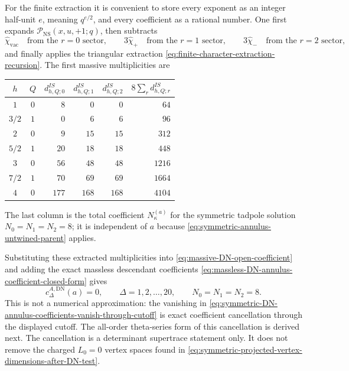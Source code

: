 \documentclass[11pt]{article}
\newcommand{\vac}{\mathrm{vac}}
\newcommand{\NS}{\mathrm{NS}}
\newcommand{\DN}{\mathrm{DN}}
\begin{document}
For the finite extraction it is convenient to store every exponent as an integer half-unit
\(e\), meaning \(q^{e/2}\), and every coefficient as a rational number. One first expands
\(\mathcal P_{\NS}(x,u,+1;q)\), then subtracts
\[
  \widehat\chi_{\vac}\quad\text{from the }r=0\text{ sector},\qquad
  3\widehat\chi_{+}\quad\text{from the }r=1\text{ sector},\qquad
  3\widehat\chi_{-}\quad\text{from the }r=2\text{ sector},
\]
and finally applies the triangular extraction
\eqref{eq:finite-character-extraction-recursion}. The first massive multiplicities are
\begin{center}
\begin{tabular}{@{}ccrrrr@{}}
\toprule
\(h\) & \(Q\) & \(d_{h,Q;0}^{IS}\) & \(d_{h,Q;1}^{IS}\) & \(d_{h,Q;2}^{IS}\)
& \(8\sum_r d_{h,Q;r}^{IS}\) \\
\midrule
\(1\) & \(0\) & \(8\) & \(0\) & \(0\) & \(64\) \\
\(3/2\) & \(1\) & \(0\) & \(6\) & \(6\) & \(96\) \\
\(2\) & \(0\) & \(9\) & \(15\) & \(15\) & \(312\) \\
\(5/2\) & \(1\) & \(20\) & \(18\) & \(18\) & \(448\) \\
\(3\) & \(0\) & \(56\) & \(48\) & \(48\) & \(1216\) \\
\(7/2\) & \(1\) & \(70\) & \(69\) & \(69\) & \(1664\) \\
\(4\) & \(0\) & \(177\) & \(168\) & \(168\) & \(4104\) \\
\bottomrule
\end{tabular}
\end{center}
The last column is the total coefficient \(N_\kappa^{(a)}\) for the symmetric tadpole solution
\(N_0=N_1=N_2=8\); it is independent of \(a\) because
\eqref{eq:symmetric-annulus-untwined-parent} applies.

Substituting these extracted multiplicities into
\eqref{eq:massive-DN-open-coefficient} and adding the exact massless descendant coefficients
\eqref{eq:massless-DN-annulus-coefficient-closed-form} gives
\begin{equation}
  c_\Delta^{A,\DN}(a)=0,
  \qquad
  \Delta=1,2,\ldots,20,
  \qquad
  N_0=N_1=N_2=8 .
  \label{eq:symmetric-DN-annulus-coefficients-vanish-through-cutoff}
\end{equation}
This is not a numerical approximation: the vanishing in
\eqref{eq:symmetric-DN-annulus-coefficients-vanish-through-cutoff} is exact coefficient
cancellation through the displayed cutoff. The all-order theta-series form of this cancellation
is derived next. The cancellation is a determinant supertrace statement only. It does not remove
the charged \(L_0=0\) vertex spaces found in
\eqref{eq:symmetric-projected-vertex-dimensions-after-DN-test}.
\end{document}
